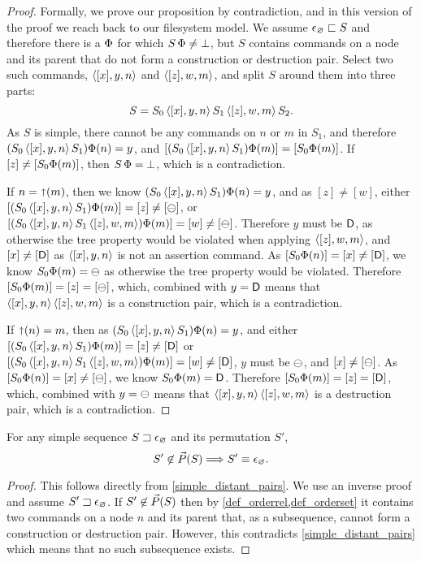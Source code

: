 \begin{proof}
Formally, we prove our proposition by contradiction,
and in this version of the proof we reach back to our filesystem model.
We assume $\epsilon_\varnothing\sqsubset{S}$ and therefore there is a $\Phi$ for which $S\,\Phi\neq\bot$,
but $S$ contains commands on a node and its parent that do not form a construction or destruction pair.
Select two such commands, $\langle{[x],y,n}\rangle$ and $\langle{[z],w,m}\rangle$,
and split $S$ around them into three parts:
\[ S = S_0 \, \langle{[x],y,n}\rangle \, S_1 \, \langle{[z],w,m}\rangle \, S_2. \]
As $S$ is simple, there cannot be any commands on $n$ or $m$ in $S_1$,
and therefore $(S_0\,\langle{[x],y,n}\rangle\, S_1)\Phi(n) = y$,
and $[(S_0\,\langle{[x],y,n}\rangle\, S_1)\Phi(m)] = [S_0\Phi(m)]$.
If $[z]\neq[S_0\Phi(m)]$, then $S\,\Phi=\bot$, which is a contradiction.

If $n=\mathord{\shortuparrow}(m)$, then 
we know $(S_0\,\langle{[x],y,n}\rangle\, S_1)\Phi(n) = y$, and as $[z]\neq[w]$, either
$[(S_0\,\langle{[x],y,n}\rangle\, S_1)\Phi(m)]=[z]\neq[\ominus]$,
or $[(S_0\,\langle{[x],y,n}\rangle\, S_1\,\langle{[z],w,m}\rangle)\Phi(m)]=[w]\neq[\ominus]$.
Therefore $y$ must be $\mathsf{D}$, as otherwise the tree property would be violated
when applying $\langle{[z],w,m}\rangle$,
and $[x]\neq[\mathsf{D}]$ as $\langle{[x],y,n}\rangle$ is not an assertion command.
As $[S_0\Phi(n)]=[x]\neq[\mathsf{D}]$, we know
$S_0\Phi(m)=\ominus$ as otherwise the tree property would be violated.
Therefore $[S_0\Phi(m)]=[z]=[\ominus]$, which, combined with $y=\mathsf{D}$
means that $\langle{[x],y,n}\rangle\,\langle{[z],w,m}\rangle$ is a construction pair, which is a contradiction.

If $\mathord{\shortuparrow}(n)=m$, then 
as $(S_0\,\langle{[x],y,n}\rangle\, S_1)\Phi(n) = y$, and either
$[(S_0\,\langle{[x],y,n}\rangle\, S_1)\Phi(m)]=[z]\neq[\mathsf{D}]$
or $[(S_0\,\langle{[x],y,n}\rangle\, S_1\,\langle{[z],w,m}\rangle)\Phi(m)]=[w]\neq[\mathsf{D}]$,
$y$ must be $\ominus$, and $[x]\neq[\ominus]$.
As $[S_0\Phi(n)]=[x]\neq[\ominus]$, we know $S_0\Phi(m)=\mathsf{D}$.
Therefore $[S_0\Phi(m)]=[z]=[\mathsf{D}]$, which, combined with $y=\ominus$
means that $\langle{[x],y,n}\rangle\,\langle{[z],w,m}\rangle$ is a destruction pair, which is a contradiction.
\end{proof}


\begin{mycor}
For any simple sequence ${S}\sqsupset\epsilon_\varnothing$ and its permutation $S'$, 
\[ S'\not\in\vec{P}({S}) \Longrightarrow S'\equiv\epsilon_\varnothing. \]
\end{mycor}
\begin{proof}
This follows directly from \cref{simple_distant_pairs}.
We use an inverse proof and assume ${S'}\sqsupset\epsilon_\varnothing$.
If $S'\not\in\vec{P}({S})$ then by \cref{def_orderrel,def_orderset}
it contains two commands on a node $n$ and its parent
that, as a subsequence,
cannot form a construction or destruction pair.
However, this contradicts \cref{simple_distant_pairs}
which means that no such subsequence exists.
\end{proof}



